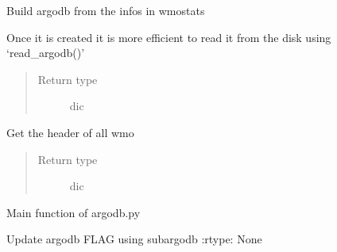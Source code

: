 \documentclass[letterpaper,10pt,english]{sphinxmanual}
\begin{document}
\begin{fulllineitems}
\label{\detokenize{pargopy:pargopy.argodb.get_header_of_all_profiles}}
Build argodb from the infos in wmostats

Once it is created it is more efficient to read it from the disk
using ‘read\_argodb()’
\begin{quote}\begin{description}
\item[{Return type}] \leavevmode
dic

\end{description}\end{quote}

\end{fulllineitems}


\begin{fulllineitems}
\label{\detokenize{pargopy:pargopy.argodb.get_header_of_all_wmos}}
Get the header of all wmo
\begin{quote}\begin{description}
\item[{Return type}] \leavevmode
dic

\end{description}\end{quote}

\end{fulllineitems}


\begin{fulllineitems}
\label{\detokenize{pargopy:pargopy.argodb.main}}
Main function of argodb.py

\end{fulllineitems}


\begin{fulllineitems}
\label{\detokenize{pargopy:pargopy.argodb.propagate_flag_backward}}
Update argodb FLAG using subargodb
:rtype: None

\end{fulllineitems}
\end{document}
